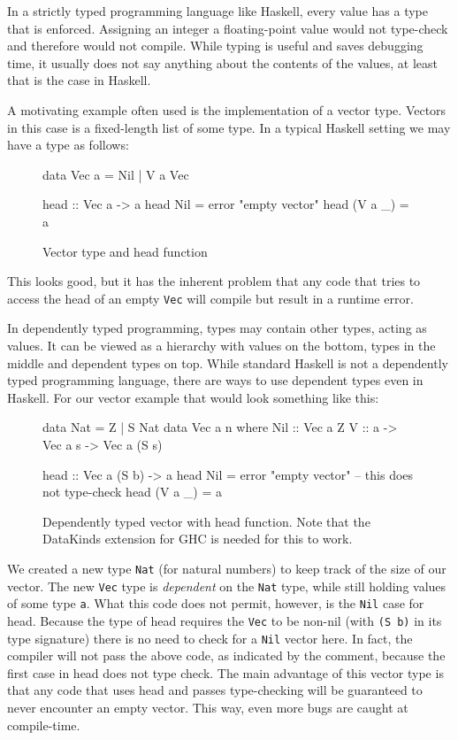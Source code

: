 \documentclass[a4paper,12pt,twosided]{report}
\begin{document}
In a strictly typed programming language like Haskell, every value has a type
that is enforced. Assigning an integer a floating-point value would not
type-check and therefore would not compile. While typing is useful and saves
debugging time, it usually does not say anything about the contents of the
values, at least that is the case in Haskell.

A motivating example often used is the implementation of a vector type. Vectors
in this case is a fixed-length list of some type. In a typical Haskell setting
we may have a type as follows:

\begin{figure}[H]
\begin{code}
data Vec a = Nil | V a Vec

head :: Vec a -> a
head Nil = error "empty vector"
head (V a _) = a
\end{code}
\caption{Vector type and head function}
\end{figure}

This looks good, but it has the inherent problem that any code that tries to
access the head of an empty \texttt{Vec} will compile but result in a runtime error. 

In dependently typed programming, types may contain other types, acting as
values. It can be viewed as a hierarchy with values on the bottom, types in the
middle and dependent types on top. While standard Haskell is not a dependently
typed programming language, there are ways to use dependent types even in
Haskell. For our vector example that would look something like this:

\begin{figure}[H]
\begin{code}
data Nat = Z | S Nat
data Vec a n where
    Nil :: Vec a Z
    V :: a -> Vec a s -> Vec a (S s)

head :: Vec a (S b) -> a
head Nil = error "empty vector" -- this does not type-check
head (V a _) = a
\end{code}
\caption{Dependently typed vector with head function. Note that the DataKinds
extension for GHC is needed for this to work.}
\end{figure}

We created a new type \texttt{Nat} (for natural numbers) to keep track of the
size of our vector. The new \texttt{Vec} type is \textit{dependent} on the
\texttt{Nat} type, while still holding values of some type \texttt{a}. What this
code does not permit, however, is the \texttt{Nil} case for head. Because the
type of head requires the \texttt{Vec} to be non-nil (with \texttt{(S b)} in its
type signature) there is no need to check for a \texttt{Nil} vector here. In
fact, the compiler will not pass the above code, as indicated by the comment,
because the first case in head does not type check. The main advantage of this
vector type is that any code that uses head and passes type-checking will be
guaranteed to never encounter an empty vector.  This way, even more bugs are
caught at compile-time.
\end{document}
